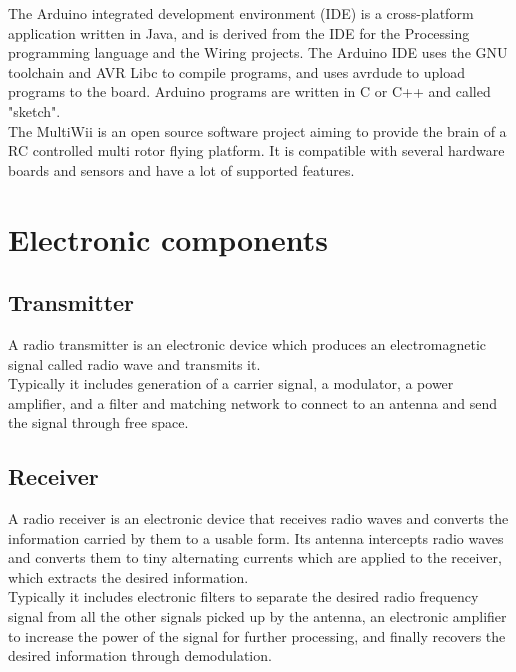 \documentclass[12pt, a4paper,twoside]{tesi_upf}
\begin{document}
The Arduino integrated development environment (IDE) is a cross-platform application written in Java, and is derived from the IDE for the Processing programming language and the Wiring projects. The Arduino IDE uses the GNU toolchain and AVR Libc to compile programs, and uses avrdude to upload programs to the board. Arduino programs are written in C or C++ and called "sketch". 
\\[12pt]

The MultiWii is an open source software project aiming to provide the brain of a RC controlled multi rotor flying platform. It is compatible with several hardware boards and sensors and have a lot of supported features.
\\[12pt]

\chapter{Electronic components}

\section{Transmitter}

A radio transmitter is an electronic device which produces an electromagnetic signal called radio wave and transmits it. 
\\[12pt]

Typically it includes generation of a carrier signal, a modulator, a power amplifier, and a filter and matching network to connect to an antenna and send the signal through free space.

\section{Receiver}

A radio receiver is an electronic device that receives radio waves and converts the information carried by them to a usable form. Its antenna intercepts radio waves and converts them to tiny alternating currents which are applied to the receiver, which extracts the desired information.
\\[12pt]

Typically it includes electronic filters to separate the desired radio frequency signal from all the other signals picked up by the antenna, an electronic amplifier to increase the power of the signal for further processing, and finally recovers the desired information through demodulation.
\end{document}
